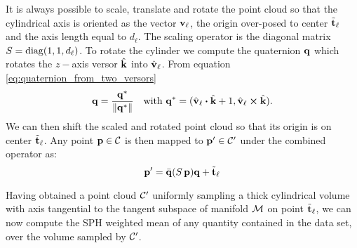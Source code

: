 It is always possible to scale, translate and rotate the point cloud so that the cylindrical axis is oriented as the vector $\boldsymbol{\mathbf{v}}_{\ell}$, the origin over-posed to center $\tilde{\boldsymbol{\mathbf{t}}}_{\ell}$ and the axis length equal to $d_{\ell}$.
The scaling operator is the diagonal matrix $S = \operatorname{diag}(1, 1, d_{\ell})$.
To rotate the cylinder we compute the quaternion $\mathbf{q}$ which rotates the $z-$axis versor $\hat{\boldsymbol{\mathbf{k}}}$ into $\hat{\boldsymbol{\mathbf{v}}}_{\ell}$. From equation \eqref{eq:quaternion_from_two_versors}
\begin{equation}
  \quat{q} = \frac{\quat{q^*}}{\norm{\quat{q^*}}} \quad \text{with }
  \quat{q^*} = (\hat{\vect{v}}_{\ell} \vdot \hat{\vect{k}} + 1, \hat{\vect{v}}_{\ell} \cross \hat{\vect{k}}).
\end{equation}
We can then shift the scaled and rotated point cloud so that its origin is on center $\tilde{\boldsymbol{\mathbf{t}}}_{\ell}$.
Any point $\boldsymbol{\mathbf{p}} \in \mathcal{C}$ is then mapped to $\boldsymbol{\mathbf{p}}' \in \mathcal{C}'$ under the combined operator as:
\begin{equation}\label{eq:cylOperator}
  \boldsymbol{\mathbf{p}}' = \bar{\mathbf{q}}(S\,\boldsymbol{\mathbf{p}})\mathbf{q} + \tilde{\boldsymbol{\mathbf{t}}}_\ell
\end{equation}

Having obtained a point cloud $\mathcal{C}'$ uniformly sampling a thick cylindrical volume with axis tangential to the tangent subspace of manifold $\mathcal{M}$ on point $\tilde{\boldsymbol{\mathbf{t}}}_\ell$,
we can now compute the SPH weighted mean of any quantity contained in the data set, over the volume sampled by $\mathcal{C}'$.

